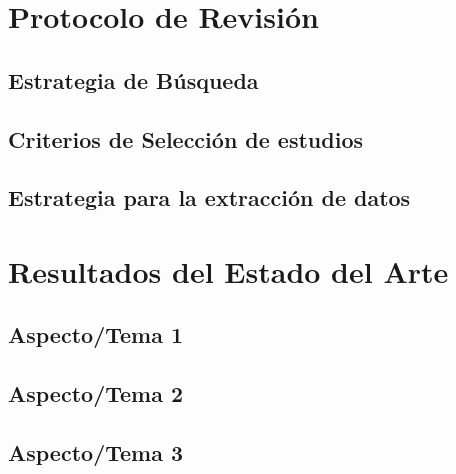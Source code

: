 \documentclass[12]{informe_investigacion}
\begin{document}
\chapter{Protocolo de Revisión}
\section{Estrategia de Búsqueda}
\section{Criterios de Selección de estudios}
\section{Estrategia para la extracción de datos}

\chapter{Resultados del Estado del Arte}
\section{Aspecto/Tema 1}
\section{Aspecto/Tema 2}
\section{Aspecto/Tema 3}
\end{document}
